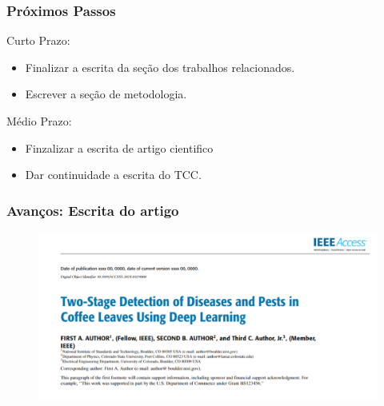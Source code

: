 \documentclass[aspectratio=169]{beamer}
\begin{document}
\begin{frame}
    \frametitle{Próximos Passos}

    \begin{block}{Curto Prazo:}

        \begin{itemize}
            \item Finalizar a escrita da seção dos trabalhos relacionados.
            \item Escrever a seção de metodologia.


        \end{itemize}

    \end{block}



    \begin{block}{Médio Prazo:}

        \begin{itemize}
            \item \color{blue} Finzalizar a escrita de artigo cientifico
            \item \color{blue} Dar continuidade a escrita do TCC.
        \end{itemize}

    \end{block}




\end{frame}






\begin{frame}
    \frametitle{Avanços: Escrita do artigo}

    \centering
    \begin{figure}
        \centering
        \includegraphics[scale = 0.5]{img/PrintArtigo.png}
    \end{figure}


\end{frame}
\end{document}

